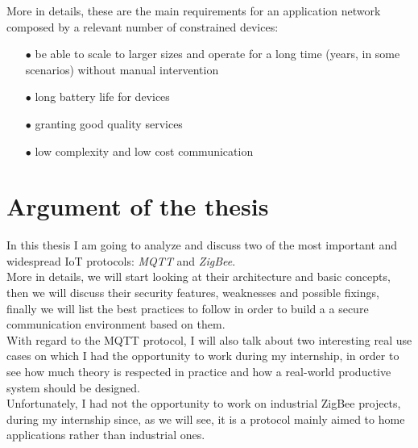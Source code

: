 \documentclass[12pt]{report}
\begin{document}
More in details, these are the main requirements for an application network composed by a relevant number of constrained devices:

\begin{itemize}
\setlength{\itemindent}{+4mm}
\item[$\bullet$] be able to scale to larger sizes and operate for a long time (years, in some scenarios) without manual intervention
\item[$\bullet$] long battery life for devices
\item[$\bullet$] granting good quality services
\item[$\bullet$] low complexity and low cost communication
\end{itemize}

\section{Argument of the thesis}
\bigskip
In this thesis I am going to analyze and discuss two of the most important and widespread IoT protocols: \emph{MQTT} and \emph{ZigBee}.\\
More in details, we will start looking at their architecture and basic concepts, then we will discuss their security features, weaknesses and possible fixings, finally we will list the best practices to follow in order to build a a secure communication environment based on them.\\

With regard to the MQTT protocol, I will also talk about two interesting real use cases on which I had the opportunity to work during my internship, in order to see how much theory is respected in practice and how a real-world productive system should be designed.\\

Unfortunately, I had not the opportunity to work on industrial ZigBee projects, during my internship since, as we will see, it is a protocol mainly aimed to home applications rather than industrial ones.\\\newline
\end{document}
